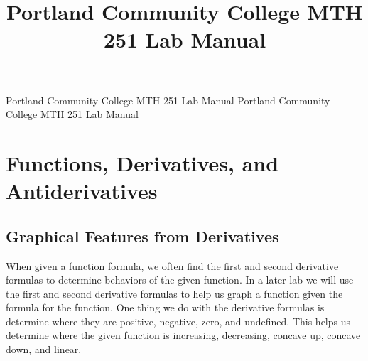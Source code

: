 \documentclass[12pt,]{book}
\title{Portland Community College MTH 251 Lab Manual}
\author{}
\date{}
\theoremstyle{plain}
\theoremstyle{definition}
\begin{document}
\frontmatter
\thispagestyle{empty}
{\centering
\vspace*{0.28\textheight}
{\Huge Portland Community College MTH 251 Lab Manual}}
\clearpage
\thispagestyle{empty}
\null%
\clearpage
\thispagestyle{empty}
{\centering
\vspace*{0.14\textheight}
{\Huge Portland Community College MTH 251 Lab Manual}\\[2\baselineskip]
}
\clearpage
\thispagestyle{empty}
\null\clearpage
\setcounter{tocdepth}{1}
\renewcommand*\contentsname{Contents}
\tableofcontents
\mainmatter
\typeout{************************************************}
\typeout{************************************************}
\chapter[Functions, Derivatives, and Antiderivatives]{Functions, Derivatives, and Antiderivatives}\label{chapter-functions-derivatives-antiderivatives}
\typeout{************************************************}
\typeout{************************************************}
\section[Graphical Features from Derivatives]{Graphical Features from Derivatives}\label{section-graphical-features-from-derivatives}
When given a function formula, we  often find the first and second derivative formulas to determine behaviors of the given function.  In a later lab we will use the first and second derivative formulas to help us graph a function given the formula for the function.  One thing we do with the derivative formulas is determine where they are positive, negative, zero, and undefined. This helps us determine where the given function is increasing, decreasing, concave up, concave down, and linear.%
\typeout{************************************************}
\typeout{************************************************}
\end{document}
